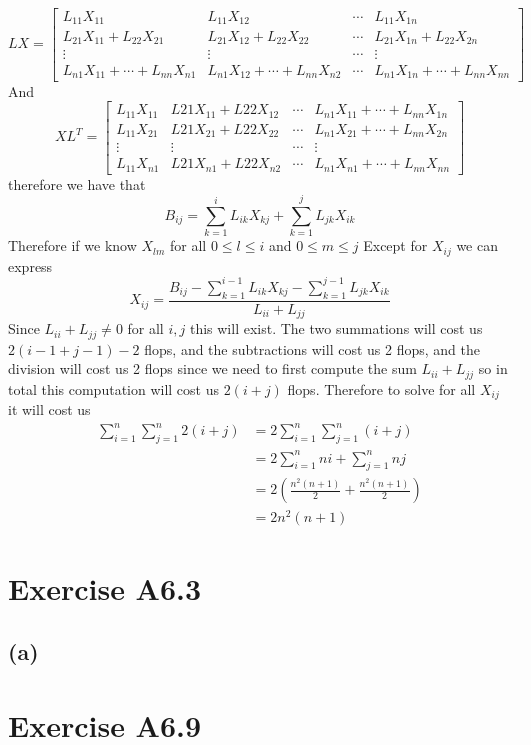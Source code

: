$$LX=\begin{bmatrix}
    L_{11}X_{11} & L_{11}X_{12} & \cdots & L_{11}X_{1n} \\
    L_{21}X_{11}+L_{22}X_{21} & L_{21}X_{12}+L_{22}X_{22} & \cdots & L_{21}X_{1n}+L_{22}X_{2n} \\
    \vdots & \vdots & \cdots & \vdots \\
    L_{n1}X_{11}+\cdots+L_{nn}X_{n1} & L_{n1}X_{12}+\cdots+L_{nn}X_{n2} & \cdots & L_{n1}X_{1n}+\cdots+L_{nn}X_{nn}
\end{bmatrix}$$
And 
$$XL^T=\begin{bmatrix}
    L_{11}X_{11} & L{21}X_{11}+L{22}X_{12}& \cdots & L_{n1}X_{11}+\cdots+L_{nn}X_{1n} \\
    L_{11}X_{21} & L{21}X_{21}+L{22}X_{22}& \cdots & L_{n1}X_{21}+\cdots+L_{nn}X_{2n} \\
    \vdots & \vdots & \cdots & \vdots \\
    L_{11}X_{n1} & L{21}X_{n1}+L{22}X_{n2}& \cdots & L_{n1}X_{n1}+\cdots+L_{nn}X_{nn}
\end{bmatrix}$$
therefore we have that 
$$B_{ij}=\sum_{k=1}^i L_{ik}X_{kj}+\sum_{k=1}^j L_{jk}X_{ik}$$
Therefore if we know $X_{lm}$ for all $0 \leq l\leq i$ and $0\leq m\leq j$ 
Except for $X_{ij}$ we can express
$$X_{ij}=\frac{B_{ij}-\sum_{k=1}^{i-1} L_{ik}X_{kj}-\sum_{k=1}^{j-1} L_{jk}X_{ik}}{L_{ii}+L_{jj}}$$
Since $L_{ii}+L_{jj}\neq 0$ for all $i,j$ this will exist. The two summations will cost us $2(i-1+j-1)-2$ flops, and the subtractions will cost us
2 flops, and the division will cost us 2 flops since we need to first compute the sum 
$L_{ii}+L_{jj}$
so in total this computation will cost us $2(i+j)$ flops.
Therefore to solve for all $X_{ij}$ it will cost us
\begin{align*}
    \sum_{i=1}^n\sum_{j=1}^n 2(i+j) &= 2\sum_{i=1}^n\sum_{j=1}^n (i+j) \\
    &=2\sum_{i=1}^n ni+\sum_{j=1}^n nj \\
    &=2\left(\frac{n^2(n+1)}{2}+\frac{n^2(n+1)}{2} \right)\\
    &=\boxed{2n^2(n+1)}
\end{align*}
\section*{Exercise A6.3}
\subsection*{(a)}
\section*{Exercise A6.9}
